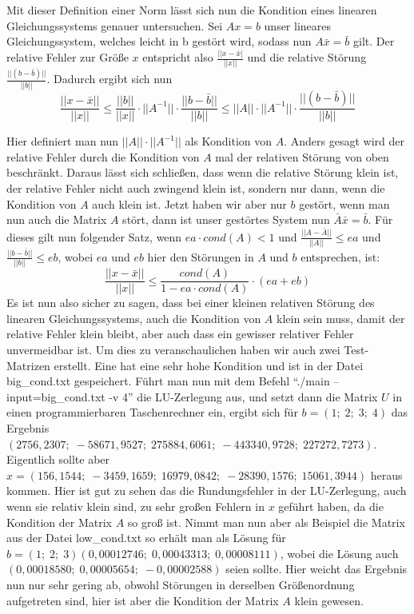 \documentclass[course=erap]{aspdoc}
\begin{document}
Mit dieser Definition einer Norm lässt sich nun die Kondition eines linearen 
Gleichungssystems genauer untersuchen\cite[47, 48]{M2017}. Sei $Ax=b$ unser lineares Gleichungssystem, 
welches leicht in b gestört wird, sodass nun $A \bar{x}=\bar{b}$ gilt.
Der relative Fehler zur Größe $x$ entspricht also 
$\frac{||x-\bar{x}|}{||x||}$ und die relative Störung 
$\frac{||(b-\bar{b})||}{||b||}$. Dadurch ergibt sich nun 
  \begin{equation}
    \label{norm}
    \frac{||x- \bar{x}||}{||x||}   \leq    \frac{||b||} {||x||} \cdot ||A^{-1}|| \cdot \frac{||b-\bar{b}||}{||b||} \leq ||A|| \cdot ||A^{-1}|| \cdot \frac{||(b-\bar{b})||} {||b||}
  \end{equation}
 
Hier definiert man nun $||A|| \cdot ||A^{-1}||$ als Kondition von $A$. Anders gesagt wird 
der relative Fehler durch die Kondition von $A$ mal der relativen Störung 
von oben beschränkt. Daraus lässt sich schließen, dass wenn die relative Störung klein 
ist, der relative Fehler nicht auch zwingend klein ist, sondern nur dann, wenn die 
Kondition von $A$ auch klein ist\cite[47]{M2017}.
Jetzt haben wir aber nur $b$ gestört, wenn man nun auch die Matrix $A$ stört, dann ist 
unser gestörtes System nun $\bar{A} \bar{x} = \bar{b}$. Für dieses gilt nun folgender Satz, 
wenn $ea \cdot cond(A) < 1$ und $\frac{||A - \bar{A}||} {||A||} \leq ea $	und 	$\frac{||b - \bar{b}||} {||b||} \leq eb $, wobei 
$ea$ und $eb$ hier den Störungen in $A$ und $b$ entsprechen, ist:\\
  \begin{equation}
    \frac{||x-\bar{x}||} {||x||} \leq \frac{cond(A)} {1- ea \cdot cond(A)} \cdot (ea + eb)   
  \end{equation}
Es ist nun also sicher zu sagen, dass bei einer kleinen relativen Störung des linearen 
Gleichungssystems, auch die Kondition von $A$ klein sein muss, damit der relative Fehler 
klein bleibt, aber auch dass ein gewisser relativer Fehler unvermeidbar ist\cite[48, 49]{M2017}.
Um dies zu veranschaulichen haben wir auch zwei Test-Matrizen erstellt. Eine hat eine 
sehr hohe Kondition und ist in der Datei big\_cond.txt gespeichert. Führt man nun mit dem 
Befehl ``./main --input=big\_cond.txt -v 4'' die LU-Zerlegung aus, und setzt dann die 
Matrix $U$ in einen programmierbaren Taschenrechner ein, ergibt sich  für $b = (1;\; 2;\; 3;\; 4)$ 
das Ergebnis $ (2756,2307;\;  −58671,9527;\;  275884,6061;\;  −443340,9728;\; 227272,7273) $. Eigentlich 
sollte aber $x = (156,1544;\; −3459,1659;\; 16979,0842;\; −28390,1576;\; 15061,3944)$ heraus kommen. 
Hier ist gut zu sehen das die Rundungsfehler in der LU-Zerlegung, auch wenn sie relativ 
klein sind, zu sehr großen Fehlern in $x$ geführt haben, da die Kondition der Matrix $A$ 
so groß ist. Nimmt man nun aber als Beispiel die Matrix aus der Datei low\_cond.txt so 
erhält man als Lösung für $b = (1;\; 2;\; 3) (0,00012746;\; 0,00043313;\; 0,00008111)$, wobei die 
Lösung auch $(0,00018580;\; 0,00005654;\; −0,00002588)$ seien sollte. Hier weicht das Ergebnis
nun nur sehr gering ab, obwohl Störungen in derselben Größenordnung aufgetreten sind, 
hier ist aber die Kondition der Matrix $A$ klein gewesen.
\end{document}
